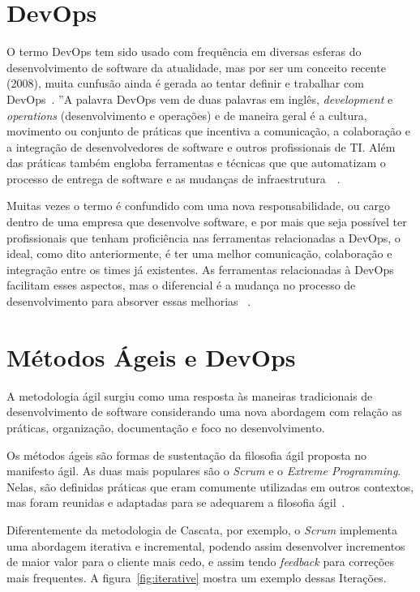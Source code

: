 \section{DevOps}
\label{sec:devops}

O termo DevOps tem sido usado com frequência em diversas esferas do
desenvolvimento de software da atualidade, mas por ser um conceito recente
(2008), muita cunfusão ainda é gerada ao tentar definir e trabalhar com
DevOps~\cite{adambertram:2016}. ''A palavra DevOps vem de duas palavras em
inglês, \textit{development} e \textit{operations} (desenvolvimento e operações) e de maneira
geral é a cultura, movimento ou conjunto de práticas que incentiva
a comunicação, a colaboração e a integração de desenvolvedores de software
e outros profissionais de TI. Além das práticas também engloba ferramentas
e técnicas que que automatizam o processo de entrega de software e as mudanças
de infraestrutura~\cite{loukides2012devops}~\cite{erich2014mapping}.

Muitas vezes o termo é confundido com uma nova responsabilidade, ou cargo
dentro de uma empresa que desenvolve software, e por mais que seja possível
ter profissionais que tenham proficiência nas ferramentas relacionadas a
DevOps, o ideal, como dito anteriormente, é ter uma melhor comunicação,
colaboração e integração entre os times já existentes. As ferramentas
relacionadas à DevOps facilitam esses aspectos, mas o diferencial é a
mudança no processo de desenvolvimento para absorver essas melhorias
~\cite{adambertram:2016}.


\section{Métodos Ágeis e DevOps}

A metodologia ágil surgiu como uma resposta às maneiras tradicionais de desenvolvimento
de software considerando uma nova abordagem com relação as práticas, organização,
documentação e foco no desenvolvimento.~\cite{agilemetorg:2016}

Os métodos ágeis são formas de sustentação da filosofia ágil proposta no manifesto
ágil\cite{fowler:2001}. As duas mais populares são o \textit{Scrum} e o \textit{Extreme Programming}. Nelas,
são definidas práticas que eram comumente utilizadas em outros contextos,
mas foram reunidas e adaptadas para se adequarem a filosofia ágil~\cite{shore:2007}.

Diferentemente da metodologia de Cascata, por exemplo, o \textit{Scrum} implementa uma
abordagem iterativa e incremental, podendo assim desenvolver incrementos de
maior valor para o cliente mais cedo, e assim tendo \textit{feedback} para correções
mais frequentes. A figura~\ref{fig:iterative} mostra um exemplo dessas
Iterações.~\cite{scrumreference:2016}

